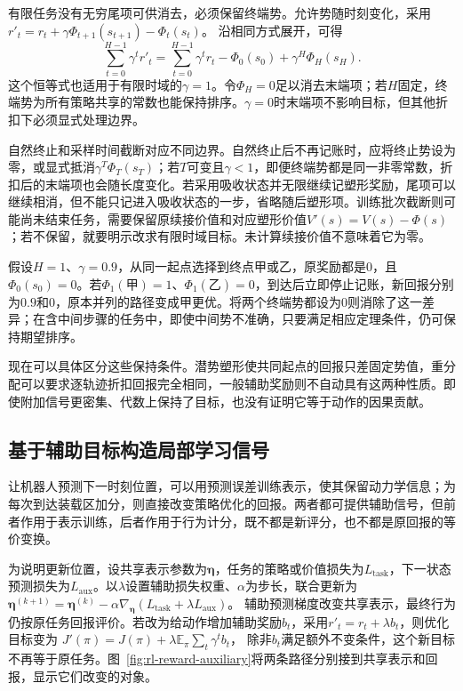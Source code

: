 有限任务没有无穷尾项可供消去，必须保留终端势。允许势随时刻变化，采用
$r'_t=r_t+\gamma\Phi_{t+1}(s_{t+1})-\Phi_t(s_t)$。
沿相同方式展开，可得
\begin{equation}
  \sum_{t=0}^{H-1}\gamma^t r'_t
  =\sum_{t=0}^{H-1}\gamma^t r_t
      -\Phi_0(s_0)+\gamma^H\Phi_H(s_H).
  \label{eq:rl-reward-shaping-terminal}
\end{equation}
这个恒等式也适用于有限时域的$\gamma=1$。令$\Phi_H=0$足以消去末端项；若$H$固定，终端势为所有策略共享的常数也能保持排序。$\gamma=0$时末端项不影响目标，但其他折扣下必须显式处理边界。

自然终止和采样时间截断对应不同边界。自然终止后不再记账时，应将终止势设为零，或显式抵消$\gamma^T\Phi_T(s_T)$；若$T$可变且$\gamma<1$，即便终端势都是同一非零常数，折扣后的末端项也会随长度变化。若采用吸收状态并无限继续记塑形奖励，尾项可以继续相消，但不能只记进入吸收状态的一步，省略随后塑形项。训练批次截断则可能尚未结束任务，需要保留原续接价值和对应塑形价值$V'(s)=V(s)-\Phi(s)$；若不保留，就要明示改求有限时域目标。未计算续接价值不意味着它为零。

\begin{example}[遗漏终端势会改变排序]
  \label{ex:rl-reward-terminal}
  假设$H=1$、$\gamma=0.9$，从同一起点选择到终点甲或乙，原奖励都是0，且$\Phi_0(s_0)=0$。若$\Phi_1(\text{甲})=1$、$\Phi_1(\text{乙})=0$，到达后立即停止记账，新回报分别为$0.9$和0，原本并列的路径变成甲更优。将两个终端势都设为0则消除了这一差异；在含中间步骤的任务中，即使中间势不准确，只要满足相应定理条件，仍可保持期望排序。
\end{example}

现在可以具体区分这些保持条件。潜势塑形使共同起点的回报只差固定势值，重分配可以要求逐轨迹折扣回报完全相同，一般辅助奖励则不自动具有这两种性质。即使附加信号更密集、代数上保持了目标，也没有证明它等于动作的因果贡献。

\subsection{基于辅助目标构造局部学习信号}
\label{sec:rl-reward-auxiliary}

让机器人预测下一时刻位置，可以用预测误差训练表示，使其保留动力学信息；为每次到达装载区加分，则直接改变策略优化的回报。两者都可提供辅助信号，但前者作用于表示训练，后者作用于行为计分，既不都是新评分，也不都是原回报的等价变换。

为说明更新位置，设共享表示参数为$\bm{\eta}$，任务的策略或价值损失为$L_{\mathrm{task}}$，下一状态预测损失为$L_{\mathrm{aux}}$。以$\lambda$设置辅助损失权重、$\alpha$为步长，联合更新为
$\bm{\eta}^{(k+1)}=\bm{\eta}^{(k)}
-\alpha\nabla_{\bm{\eta}}(L_{\mathrm{task}}+\lambda L_{\mathrm{aux}})$。
辅助预测梯度改变共享表示，最终行为仍按原任务回报评价。若改为给动作增加辅助奖励$b_t$，采用$r'_t=r_t+\lambda b_t$，则优化目标变为
$J'(\pi)=J(\pi)+\lambda\mathbb E_\pi\sum_t\gamma^t b_t$，
除非$b_t$满足额外不变条件，这个新目标不再等于原任务。图~\ref{fig:rl-reward-auxiliary}将两条路径分别接到共享表示和回报，显示它们改变的对象。

